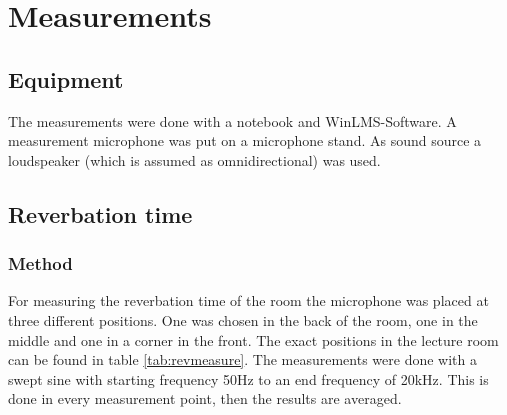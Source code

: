 \documentclass{article}
\begin{document}
\section{Measurements}
\subsection{Equipment}
The measurements were done with a notebook and WinLMS-Software. A measurement microphone was put on a microphone stand. As sound source a loudspeaker (which is assumed as omnidirectional) was used.
\subsection{Reverbation time}
\subsubsection{Method}
For measuring the reverbation time of the room the microphone was placed at three different positions. One was chosen in the back of the room, one in the middle and one in a corner in the front. The exact positions in the lecture room can be found in table \ref{tab:revmeasure}. The measurements were done with a swept sine with starting frequency 50Hz to an end frequency of 20kHz. This is done in every measurement point, then the results are averaged.
\end{document}
